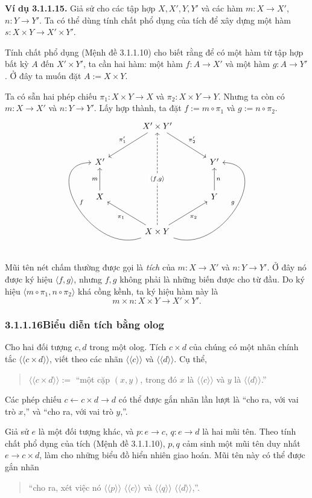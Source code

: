 \noindent\textbf{Ví dụ 3.1.1.15.} Giả sử cho các tập hợp $X,X',Y,Y'$ và các hàm $m:X\to X'$, $n:Y\to Y'$. Ta có thể dùng tính chất phổ dụng của tích để xây dựng một hàm $s:X\times Y\to X'\times Y'$.

Tính chất phổ dụng (Mệnh đề 3.1.1.10) cho biết rằng để có một hàm từ tập hợp bất kỳ $A$ đến $X'\times Y'$, ta cần hai hàm: một hàm $f:A\to X'$ và một hàm $g:A\to Y'$. Ở đây ta muốn đặt $A:=X\times Y$.

Ta có sẵn hai phép chiếu $\pi_1:X\times Y\to X$ và $\pi_2:X\times Y\to Y$. Nhưng ta còn có $m:X\to X'$ và $n:Y\to Y'$. Lấy hợp thành, ta đặt $f:=m\circ\pi_1$ và $g:=n\circ\pi_2$.
\[\begin{tikzcd}[column sep=large,row sep=large]
&X'\times Y'\arrow[dl,"\pi'_1"']\arrow[dr,"\pi'_2"]&\\
X'&&Y'\\
X\arrow[u,"m"]&&Y\arrow[u,"n"']\\
&X\times Y\arrow[ul,"\pi_1"]\arrow[ur,"\pi_2"']\arrow[uuu,dashed,"{\langle f,g\rangle}" description]\arrow[uul,out=200,in=180,looseness=1.5,"f"']\arrow[uur,out=-20,in=0,looseness=1.5,"g"]&
\end{tikzcd}\]
Mũi tên nét chấm thường được gọi là \emph{tích} của $m:X\to X'$ và $n:Y\to Y'$. Ở đây nó được ký hiệu $\langle f,g\rangle$, nhưng $f,g$ không phải là những biến được cho từ đầu. Do ký hiệu $\langle m\circ\pi_1,n\circ\pi_2\rangle$ khá cồng kềnh, ta ký hiệu hàm này là
\[m\times n:X\times Y\to X'\times Y'.\]

\subsubsection*{3.1.1.16\quad Biểu diễn tích bằng olog}
Cho hai đối tượng $c,d$ trong một olog. Tích $c\times d$ của chúng có một nhãn chính tắc $\langle\!\langle c\times d\rangle\!\rangle$, viết theo các nhãn $\langle\!\langle c\rangle\!\rangle$ và $\langle\!\langle d\rangle\!\rangle$. Cụ thể,
\begin{quote}
$\langle\!\langle c\times d\rangle\!\rangle:=$ ``một cặp $(x,y)$, trong đó $x$ là $\langle\!\langle c\rangle\!\rangle$ và $y$ là $\langle\!\langle d\rangle\!\rangle$.''
\end{quote}
Các phép chiếu $c\leftarrow c\times d\to d$ có thể được gắn nhãn lần lượt là ``cho ra, với vai trò $x$,'' và ``cho ra, với vai trò $y$,''.

Giả sử $e$ là một đối tượng khác, và $p:e\to c$, $q:e\to d$ là hai mũi tên. Theo tính chất phổ dụng của tích (Mệnh đề 3.1.1.10), $p,q$ cảm sinh một mũi tên duy nhất $e\to c\times d$, làm cho những biểu đồ hiển nhiên giao hoán. Mũi tên này có thể được gắn nhãn
\begin{quote}
``cho ra, xét việc nó $\langle\!\langle p\rangle\!\rangle$ $\langle\!\langle c\rangle\!\rangle$ và $\langle\!\langle q\rangle\!\rangle$ $\langle\!\langle d\rangle\!\rangle$,''.
\end{quote}


